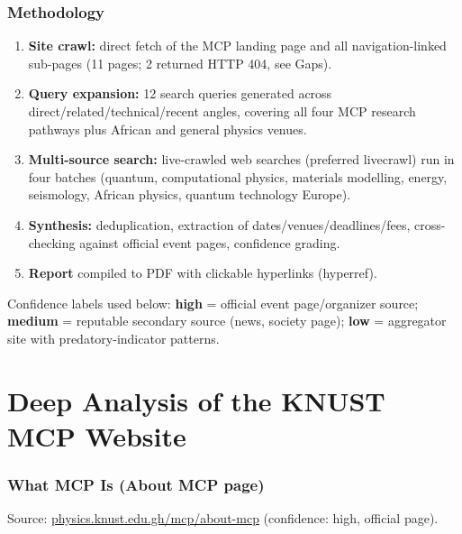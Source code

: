 \documentclass[11pt,a4paper]{article}
\begin{document}

\newpage
\section{Methodology}

\begin{enumerate}[leftmargin=1.6em]
  \item \textbf{Site crawl:} direct fetch of the MCP landing page and all navigation-linked sub-pages (11 pages; 2 returned HTTP 404, see Gaps).
  \item \textbf{Query expansion:} 12 search queries generated across direct/related/technical/recent angles, covering all four MCP research pathways plus African and general physics venues.
  \item \textbf{Multi-source search:} live-crawled web searches (preferred livecrawl) run in four batches (quantum, computational physics, materials modelling, energy, seismology, African physics, quantum technology Europe).
  \item \textbf{Synthesis:} deduplication, extraction of dates/venues/deadlines/fees, cross-checking against official event pages, confidence grading.
  \item \textbf{Report} compiled to PDF with clickable hyperlinks (hyperref).
\end{enumerate}

Confidence labels used below: \textbf{high} = official event page/organizer source; \textbf{medium} = reputable secondary source (news, society page); \textbf{low} = aggregator site with predatory-indicator patterns.

\newpage
\part{Deep Analysis of the KNUST MCP Website}

\section{What MCP Is (About MCP page)}

Source: \href{https://physics.knust.edu.gh/mcp/about-mcp}{physics.knust.edu.gh/mcp/about-mcp} (confidence: high, official page).
\end{document}
